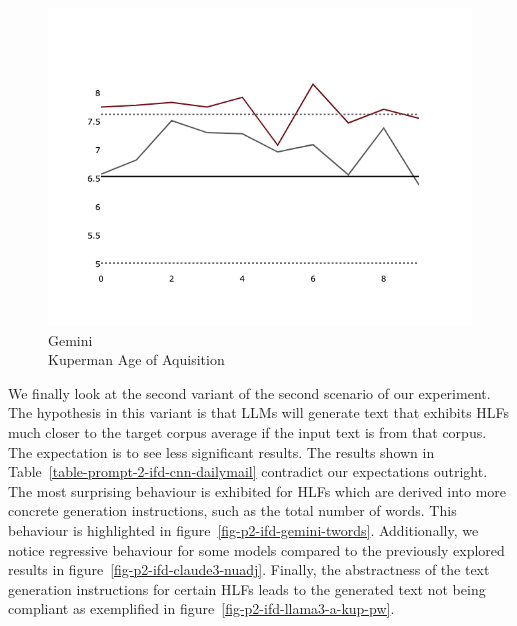 \documentclass[11pt]{article}
\begin{document}
\begin{figure}[hpb]
\begin{minipage}{0.32\textwidth}
    \end{minipage}
    \hfill
    \begin{minipage}{0.32\textwidth}
        \includegraphics[width=\linewidth]{plots/prompt_2/prompt_2-gemini-cnn_dailymail/prompt_2-gemini-cnn_dailymail_a_kup_pw.png}
        \caption[center]{Gemini\\Kuperman Age of Aquisition}\label{fig-p2-gemini-a-kup-pw}
    \end{minipage}
\end{figure}

We finally look at the second variant of the second scenario of our experiment.
The hypothesis in this variant is that LLMs will generate text that exhibits
HLFs much closer to the target corpus average if the input text is from that
corpus.
The expectation is to see less significant results.
The results shown in Table~\ref{table-prompt-2-ifd-cnn-dailymail} contradict our
expectations outright.
The most surprising behaviour is exhibited for HLFs which are derived into more
concrete generation instructions, such as the total number of words.
This behaviour is highlighted in figure~\ref{fig-p2-ifd-gemini-twords}.
Additionally, we notice regressive behaviour for some models compared to the
previously explored results in figure~\ref{fig-p2-ifd-claude3-nuadj}.
Finally, the abstractness of the text generation instructions for certain HLFs
leads to the generated text not being compliant as exemplified in
figure~\ref{fig-p2-ifd-llama3-a-kup-pw}.
\end{document}
